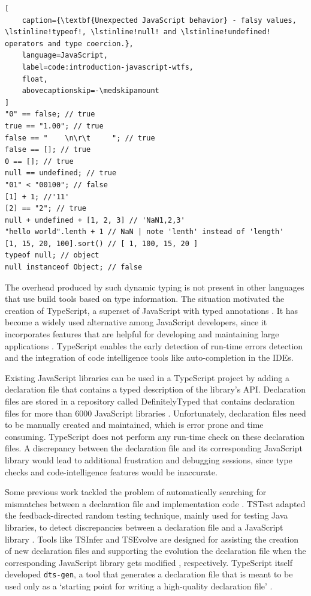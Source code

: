 \documentclass[a4paper,english,cleveref, autoref]{lipics-v2019}
\begin{document}
\begin{lstlisting}[
    caption={\textbf{Unexpected JavaScript behavior} - falsy values, \lstinline!typeof!, \lstinline!null! and \lstinline!undefined! operators and type coercion.},
    language=JavaScript,
	label=code:introduction-javascript-wtfs,
    float,
    abovecaptionskip=-\medskipamount
]
"0" == false; // true
true == "1.00"; // true
false == "    \n\r\t     "; // true
false == []; // true
0 == []; // true
null == undefined; // true
"01" < "00100"; // false
[1] + 1; //'11'
[2] == "2"; // true
null + undefined + [1, 2, 3] // 'NaN1,2,3'
"hello world".lenth + 1 // NaN | note 'lenth' instead of 'length'
[1, 15, 20, 100].sort() // [ 1, 100, 15, 20 ]
typeof null; // object
null instanceof Object; // false
\end{lstlisting}

The overhead produced by such dynamic typing is not present in other languages that use build tools based on type information. The situation motivated the creation of TypeScript, a superset of JavaScript with typed annotations \cite{typescript}. It has become a widely used alternative among JavaScript developers, since it incorporates features that are helpful for developing and maintaining large applications \cite{DBLP:conf/icse/GaoBB17}. TypeScript enables the early detection of run-time errors detection and the integration of code intelligence tools like auto-completion in the IDEs.

Existing JavaScript libraries can be used in a TypeScript project by adding a declaration file that contains a typed description of the library's API. Declaration files are stored in a repository called DefinitelyTyped that contains declaration files for more than 6000 JavaScript libraries \cite{definitely-typed-repository}. Unfortunately, declaration files need to be manually created and maintained, which is error prone and time consuming. TypeScript does not perform any run-time check on these declaration files. A discrepancy between the declaration file and its corresponding JavaScript library would lead to additional frustration and debugging sessions, since type checks and code-intelligence features would be inaccurate.

Some previous work tackled the problem of automatically searching for mismatches between a declaration file and implementation code \cite{DBLP:conf/oopsla/FeldthausM14}. TSTest adapted the feedback-directed random testing technique, mainly used for testing Java libraries, to detect discrepancies between a declaration file and a JavaScript library \cite{DBLP:journals/pacmpl/KristensenM17}. Tools like TSInfer and TSEvolve are designed for assisting the creation of new declaration files and supporting the evolution the declaration file when the corresponding JavaScript library gets modified \cite{DBLP:conf/fase/KristensenM17}, respectively. TypeScript itself developed \lstinline[language={}]{dts-gen}, a tool that generates a declaration file that is meant to be used only as a `starting point for writing a high-quality declaration file' \cite{dts-gen}.
\end{document}
